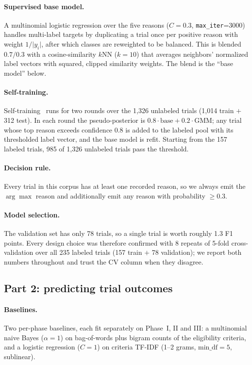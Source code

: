 \paragraph{Supervised base model.}
A multinomial logistic regression over the five reasons ($C = 0.3$,
\texttt{max\_iter}=3000) handles multi-label targets by duplicating a trial once
per positive reason with weight $1/\lvert y_i \rvert$, after which classes are
reweighted to be balanced. This is blended $0.7/0.3$ with a cosine-similarity
$k$NN ($k=10$) that averages neighbors' normalized label vectors with squared,
clipped similarity weights. The blend is the ``base model'' below.

\paragraph{Self-training.}
Self-training~\cite{yarowsky1995unsupervised,triguero2015selflabeled} runs for two
rounds over the 1,326 unlabeled trials (1,014 train $+$ 312 test). In each
round the pseudo-posterior is $0.8 \cdot \text{base} + 0.2 \cdot \text{GMM}$; any
trial whose top reason exceeds confidence 0.8 is added to the labeled pool with
its thresholded label vector, and the base model is refit. Starting from the 157
labeled trials, 985 of 1,326 unlabeled trials pass the threshold.

\paragraph{Decision rule.}
Every trial in this corpus has at least one recorded reason, so we always emit the
$\arg\max$ reason and additionally emit any reason with probability $\geq 0.3$.

\paragraph{Model selection.}
The validation set has only 78 trials, so a single trial is worth roughly 1.3 F1
points. Every design choice was therefore confirmed with 8 repeats of 5-fold
cross-validation over all 235 labeled trials (157 train $+$ 78 validation); we
report both numbers throughout and trust the CV column when they disagree.

\subsection{Part 2: predicting trial outcomes}

\paragraph{Baselines.}
Two per-phase baselines, each fit separately on Phase~I, II and III:
a multinomial naive Bayes ($\alpha = 1$) on bag-of-words plus bigram counts of the
eligibility criteria, and a logistic regression ($C = 1$) on criteria TF-IDF
(1--2 grams, $\mathrm{min\_df}=5$, sublinear).

